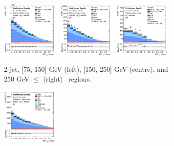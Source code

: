 \begin{figure}[h!]
    \centering
    \begin{subfigure}[b]{\textwidth}
        \centering
        \includegraphics[width=0.32\textwidth]{Images/VH/Own_fit/prefit_VHcc/Region_distmva_BMax150_BMin75_DSR_J2_TTypent_T1_L2_Y6051_Prefit.png}
        \includegraphics[width=0.32\textwidth]{Images/VH/Own_fit/prefit_VHcc/Region_distmva_BMax250_BMin150_DSR_J2_TTypent_T1_L2_Y6051_Prefit.png}
        \includegraphics[width=0.32\textwidth]{Images/VH/Own_fit/prefit_VHcc/Region_distmva_BMin250_DSR_J2_TTypent_T1_L2_Y6051_Prefit.png}
        \caption{2-jet, [75, 150] GeV (left), [150, 250] GeV (centre), and 250  GeV $\leq$ (right) \ptv\ regions.}
        \label{fig:plots_VHcc_2L_SR_1c_2J}
    \end{subfigure}
    \begin{subfigure}[b]{\textwidth}
        \centering
        \includegraphics[width=0.32\textwidth]{Images/VH/Own_fit/prefit_VHcc/Region_distmva_BMax150_BMin75_DSR_J3_TTypent_incJet1_T1_L2_Y6051_Prefit.png}

\end{subfigure}
\end{figure}
